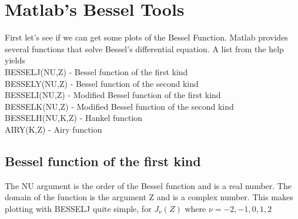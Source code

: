 \documentclass[a4paper,10pt]{article}
\begin{document}
\section{Matlab's Bessel Tools}
First let's see if we can get some plots of the Bessel Function. Matlab provides several functions that solve Bessel's differential equation. A list from the help yields \\

BESSELJ(NU,Z) - Bessel function of the first kind \\
BESSELY(NU,Z) - Bessel function of the second kind \\
BESSELI(NU,Z) - Modified Bessel function of the first kind \\
BESSELK(NU,Z) - Modified Bessel function of the second kind \\
BESSELH(NU,K,Z) - Hankel function \\
AIRY(K,Z) - Airy function \\

\subsection{Bessel function of the first kind}

The NU argument is the order of the Bessel function and is a real number. The domain of the function is the argument Z and is a complex number. This makes plotting with BESSELJ quite simple, for $J_{\nu}(Z)$ where $\nu = -2,-1,0,1,2$
\end{document}
